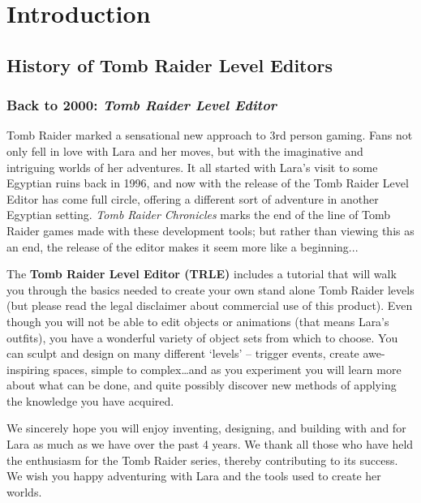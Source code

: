 \part{Introduction}
\chapter{History of Tomb Raider Level Editors}
\section{Back to 2000: \emph{Tomb Raider Level Editor} }
Tomb Raider marked a sensational new approach to 3rd person gaming. Fans not only fell in love with Lara and her moves, but with the imaginative and intriguing worlds of her adventures. It all started with Lara's visit to some Egyptian ruins back in 1996, and now with the release of the Tomb Raider Level Editor has come full circle, offering a different sort of adventure in another Egyptian setting. \emph{Tomb Raider Chronicles} marks the end of the line of Tomb Raider games made with these development tools; but rather than viewing this as an end, the release of the editor makes it seem more like a beginning...
\par The \textbf{Tomb Raider Level Editor (TRLE)} includes a tutorial that will walk you through the basics needed to create your own stand alone Tomb Raider levels (but please read the legal disclaimer about commercial use of this product). Even though you will not be able to edit objects or animations (that means Lara’s outfits), you have a wonderful variety of object sets from which to choose. You can sculpt and design on many different ‘levels’ – trigger events, create awe-inspiring spaces, simple to complex…and as you experiment you will learn more about what can be done, and quite possibly discover new methods of applying the knowledge you have acquired.
\par We sincerely hope you will enjoy inventing, designing, and building with and for Lara as much as we have over the past 4 years. We thank all those who have held the enthusiasm for the Tomb Raider series, thereby contributing to its success. We wish you happy adventuring with Lara and the tools used to create her worlds.
\cite{trle_manual}
